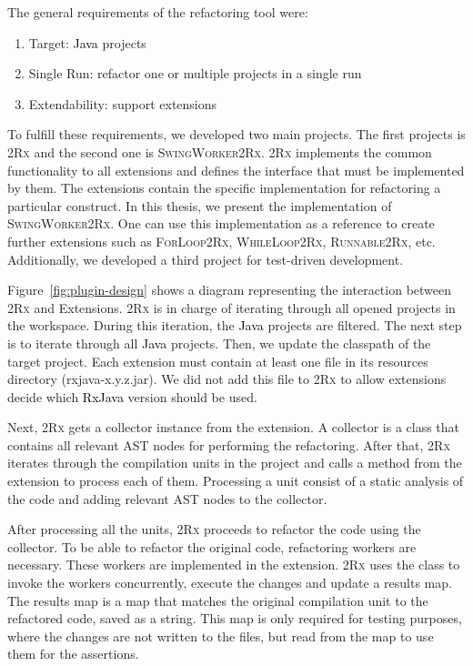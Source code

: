 \documentclass[type=bsc,accentcolor=tud9c]{tudthesis}
\newcommand{\framework}[1]{\textcolor{black}{#1}}
\newcommand{\toolcore}{\textsc{2Rx}}
\newcommand{\toolextension}{\textsc{SwingWorker2Rx}}
\begin{document}
The general requirements of the refactoring tool were:
\begin{enumerate}
	\item Target: \framework{Java} projects
	\item Single Run: refactor one or multiple projects in a single run
	\item Extendability: support extensions
\end{enumerate}

To fulfill these requirements, we developed two main projects. The first projects is \toolcore{} and the second one is \toolextension{}. \toolcore{} implements the common functionality to all extensions and defines the interface that must be implemented by them. The extensions contain the specific implementation for refactoring a particular construct. In this thesis, we present the implementation of \toolextension{}. One can use this implementation as a reference to create further extensions such as \textsc{ForLoop2Rx}, \textsc{WhileLoop2Rx}, \textsc{Runnable2Rx}, etc. Additionally, we developed a third project for test-driven development.

Figure~\ref{fig:plugin-design} shows a diagram representing the interaction between \toolcore{} and Extensions. \toolcore{} is in charge of iterating through all opened projects in the workspace. During this iteration, the \framework{Java} projects are filtered. The next step is to iterate through all \framework{Java} projects. Then, we update the classpath of the target project. Each extension must contain at least one  file in its resources directory (rxjava-x.y.z.jar). We did not add this  file to \toolcore{} to allow extensions decide which \framework{RxJava} version should be used.

Next, \toolcore{} gets a collector instance from the extension. A collector is a class that contains all relevant AST nodes for performing the refactoring. After that, \toolcore{} iterates through the compilation units in the project and calls a method from the extension to process each of them. Processing a unit consist of a static analysis of the code and adding relevant AST nodes to the collector.

After processing all the units, \toolcore{} proceeds to refactor the code using the collector. To be able to refactor the original code, refactoring workers are necessary. These workers are implemented in the extension. \toolcore{} uses the class  to invoke the workers concurrently, execute the changes and update a results map. The results map is a map that matches the original compilation unit to the refactored code, saved as a string. This map is only required for testing purposes, where the changes are not written to the files, but read from the map to use them for the assertions.
\end{document}
